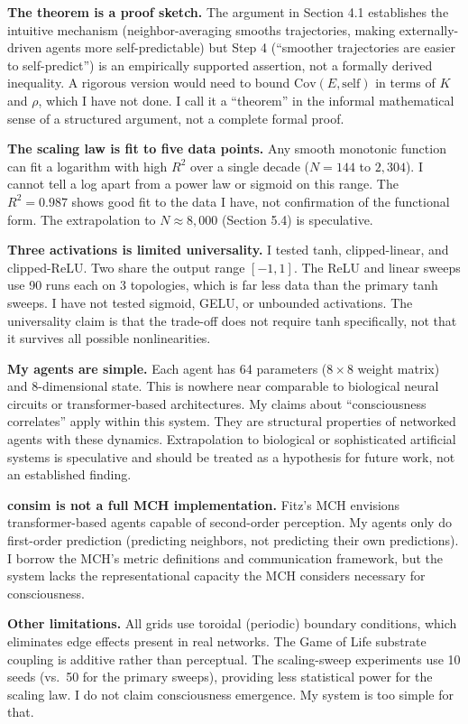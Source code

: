 \documentclass[
  11pt,
]{article}
\begin{document}
\textbf{The theorem is a proof sketch.} The argument in Section 4.1
establishes the intuitive mechanism (neighbor-averaging smooths
trajectories, making externally-driven agents more self-predictable) but
Step 4 (``smoother trajectories are easier to self-predict'') is an
empirically supported assertion, not a formally derived inequality. A
rigorous version would need to bound \(\text{Cov}(E, \text{self})\) in
terms of \(K\) and \(\rho\), which I have not done. I call it a
``theorem'' in the informal mathematical sense of a structured argument,
not a complete formal proof.

\textbf{The scaling law is fit to five data points.} Any smooth
monotonic function can fit a logarithm with high \(R^2\) over a single
decade (\(N = 144\) to \(2{,}304\)). I cannot tell a log apart from a
power law or sigmoid on this range. The \(R^2 = 0.987\) shows good fit
to the data I have, not confirmation of the functional form. The
extrapolation to \(N \approx 8{,}000\) (Section 5.4) is speculative.

\textbf{Three activations is limited universality.} I tested tanh,
clipped-linear, and clipped-ReLU. Two share the output range
\([-1, 1]\). The ReLU and linear sweeps use 90 runs each on 3
topologies, which is far less data than the primary tanh sweeps. I have
not tested sigmoid, GELU, or unbounded activations. The universality
claim is that the trade-off does not require tanh specifically, not that
it survives all possible nonlinearities.

\textbf{My agents are simple.} Each agent has 64 parameters
(\(8 \times 8\) weight matrix) and 8-dimensional state. This is nowhere
near comparable to biological neural circuits or transformer-based
architectures. My claims about ``consciousness correlates'' apply within
this system. They are structural properties of networked agents with
these dynamics. Extrapolation to biological or sophisticated artificial
systems is speculative and should be treated as a hypothesis for future
work, not an established finding.

\textbf{consim is not a full MCH implementation.} Fitz's MCH envisions
transformer-based agents capable of second-order perception. My agents
only do first-order prediction (predicting neighbors, not predicting
their own predictions). I borrow the MCH's metric definitions and
communication framework, but the system lacks the representational
capacity the MCH considers necessary for consciousness.

\textbf{Other limitations.} All grids use toroidal (periodic) boundary
conditions, which eliminates edge effects present in real networks. The
Game of Life substrate coupling is additive rather than perceptual. The
scaling-sweep experiments use 10 seeds (vs.~50 for the primary sweeps),
providing less statistical power for the scaling law. I do not claim
consciousness emergence. My system is too simple for that.
\end{document}
